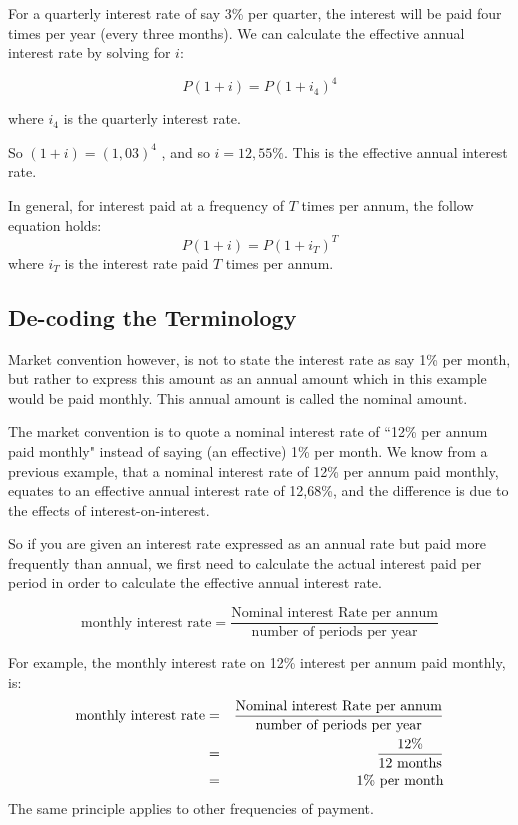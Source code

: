 For a quarterly interest rate of say 3\% per quarter, the interest will be paid four times per year (every three months). We can calculate the effective annual interest rate by solving for $i$:

\begin{equation*}
P(1 + i ) = P(1 + i_4 )^4
\end{equation*}

where $i_4$ is the quarterly interest rate.

So
$(1 + i ) = (1,03 )^4$ , and so $i = 12,55\%$. This is the effective annual interest rate.

In general, for interest paid at a frequency of $T$ times per annum, the follow equation holds:
\begin{equation}
P(1 + i) = P(1 + i_T)^{T}
\end{equation}
where $i_T$ is the interest rate paid $T$ times per annum.

\subsection{De-coding the Terminology}
Market convention however, is not to state the interest rate as say 1\% per month, but rather to express this amount as an annual amount which in this example would be paid monthly. This annual amount is called the nominal amount.

The market convention is to quote a nominal interest rate of ``12\% per annum paid monthly" instead of saying (an effective) 1\% per month. We know from a previous example, that a nominal interest rate of 12\% per annum paid monthly, equates to an effective annual interest rate of 12,68\%, and the difference is due to the effects of interest-on-interest.

So if you are given an interest rate expressed as an annual rate but paid more frequently than annual, we first need to calculate the actual interest paid per period in order to calculate the effective annual interest rate.

\begin{equation}
\mbox{monthly interest rate}=\frac{\mbox{Nominal interest Rate per annum}}{\mbox{number of periods per year}}
\end{equation}

For example, the monthly interest rate on 12\% interest per annum paid monthly, is:
\begin{eqnarray*}
\mbox{monthly interest rate}&=&\frac{\mbox{Nominal interest Rate per annum}}{\mbox{number of periods per year}}\\
&=& \frac{12\%}{12~\rm{months}}\\
&=& 1\%~\mbox{per month}
\end{eqnarray*}
The same principle applies to other frequencies of payment.

